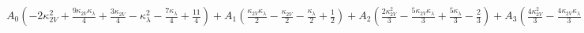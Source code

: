 $
A_{0} \left(- 2 \kappa_{2V}^{2} + \frac{9 \kappa_{2V} \kappa_{\lambda}}{4} + \frac{3 \kappa_{2V}}{4} - \kappa_{\lambda}^{2} - \frac{7 \kappa_{\lambda}}{4} + \frac{11}{4}\right) + A_{1} \left(\frac{\kappa_{2V} \kappa_{\lambda}}{2} - \frac{\kappa_{2V}}{2} - \frac{\kappa_{\lambda}}{2} + \frac{1}{2}\right) + A_{2} \left(\frac{2 \kappa_{2V}^{2}}{3} - \frac{5 \kappa_{2V} \kappa_{\lambda}}{3} + \frac{5 \kappa_{\lambda}}{3} - \frac{2}{3}\right) + A_{3} \left(\frac{4 \kappa_{2V}^{2}}{3} - \frac{4 \kappa_{2V} \kappa_{\lambda}}{3} + \frac{4 \kappa_{\lambda}}{3} - \frac{4}{3}\right) + A_{4} \left(\frac{2 \kappa_{2V} \kappa_{\lambda}}{5} - \frac{2 \kappa_{2V}}{5} + \frac{4 \kappa_{\lambda}^{2}}{5} - \frac{2 \kappa_{\lambda}}{5} - \frac{2}{5}\right) + A_{5} \left(- \frac{3 \kappa_{2V} \kappa_{\lambda}}{20} + \frac{3 \kappa_{2V}}{20} + \frac{\kappa_{\lambda}^{2}}{5} - \frac{7 \kappa_{\lambda}}{20} + \frac{3}{20}\right)
$
